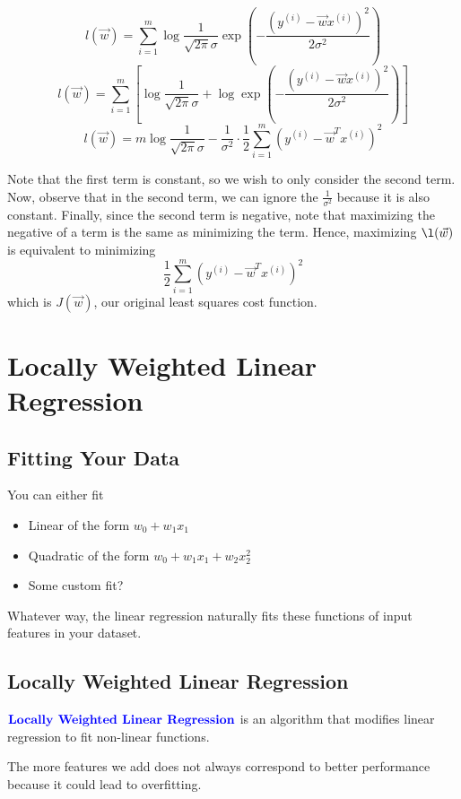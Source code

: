 \documentclass[12pt]{scrartcl}
\begin{document}
\[l(\vec{w}) = \sum_{i=1}^m \log \frac{1}{\sqrt{2\pi}\sigma }\exp(-\frac{(y^{(i)} - \vec{w}x^{(i)})^2}{2\sigma^2})\]
\[l(\vec{w}) = \sum_{i=1}^m \left[\log \frac{1}{\sqrt{2\pi}\sigma } + \log \exp(-\frac{(y^{(i)} - \vec{w}x^{(i)})^2}{2\sigma^2})\right]\]
\[l(\vec{w}) = m \log \frac{1}{\sqrt{2\pi}\sigma} - \frac{1}{\sigma^2} \cdot \frac{1}{2}\sum_{i=1}^m (y^{(i)} - \vec{w}^Tx^{(i)})^2\]
\begin{note}
    Note that the first term is constant, so we wish to only consider the second term. 
    Now, observe that in the second term, we can ignore the $\frac{1}{\sigma^2}$ because it is also constant. 
    Finally, since the second term is negative, note that maximizing the negative of a term is the same as minimizing the term. Hence, maximizing $\l(\vec{w})$ is equivalent to minimizing
    \[\frac{1}{2}\sum_{i=1}^m(y^{(i)} - \vec{w}^Tx^{(i)})^2\]
    which is $J(\vec{w})$, our original least squares cost function.
\end{note}

\section{Locally Weighted Linear Regression}

\subsection{Fitting Your Data}

You can either fit
\begin{itemize}
    \item Linear of the form $w_0 + w_1x_1$
    \item Quadratic of the form $w_0 + w_1x_1 + w_2x_2^2$
    \item Some custom fit?
\end{itemize}
Whatever way, the linear regression naturally fits these functions of input features in your dataset.

\subsection{Locally Weighted Linear Regression}
\begin{definition}
    $\textbf{\color{blue} Locally Weighted Linear Regression}$ is an algorithm that modifies linear regression to fit non-linear functions.
\end{definition}

\begin{note}
    The more features we add does not always correspond to better performance because it could lead to overfitting.
\end{note}
\end{document}
